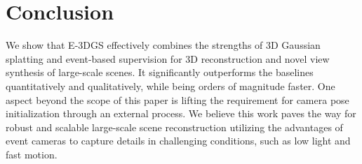 \section{Conclusion}\label{sec:Conclusion} 
\vbox{
We show that E-3DGS effectively combines the strengths of 3D Gaussian splatting and event-based supervision for 3D reconstruction and novel view synthesis of large-scale scenes. 
It significantly outperforms the baselines quantitatively and qualitatively, while being orders of magnitude faster. 
One aspect beyond the scope of this paper 
is lifting the requirement for camera pose initialization through an external process. 
We believe this work paves the way for robust and scalable large-scale scene reconstruction utilizing the advantages of event cameras to capture details in challenging conditions, such as low light and fast motion. 
}
